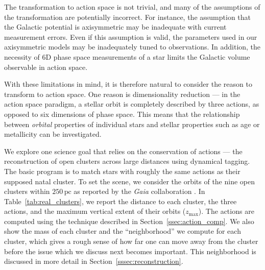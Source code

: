 \documentclass[twocolumn]{aastex62}
\newcommand{\pc}{\text{pc}}
\begin{document}
The transformation to action space is not trivial, and many of the assumptions
of the transformation are potentially incorrect. For instance, the assumption
that the Galactic potential is axisymmetric may be inadequate with current
measurement errors. Even if this assumption is valid, the parameters used in
our axisymmetric models may be inadequately tuned to observations. In
addition, the necessity of 6D phase space measurements of a star limits the
Galactic volume observable in action space.

With these limitations in mind, it is therefore natural to consider the reason
to transform to action space. One reason is dimensionality reduction --- in
the action space paradigm, a stellar orbit is completely described by three
actions, as opposed to six dimensions of phase space. This means that the
relationship between {\em orbital} properties of individual stars and stellar
properties such as age or metallicity can be investigated.

We explore one science goal that relies on the conservation of actions --- the
reconstruction of open clusters across large distances using dynamical
tagging. The basic program is to match stars with roughly the same actions as
their supposed natal cluster. To set the scene, we consider the orbits of the
nine open clusters within $250\,\pc$ as reported by the {\em Gaia}
collaboration \citep{2018AA...616A..10G}. In Table~\ref{tab:real_clusters}, we
report the distance to each cluster, the three actions, and the maximum
vertical extent of their orbits ($z_{\text{max}}$). The actions are computed
using the technique described in Section~\ref{ssec:action_comp}. We also show
the mass of each cluster and the ``neighborhood'' we compute for each cluster,
which gives a rough sense of how far one can move away from the cluster before
the issue which we discuss next becomes important. This neighborhood is
discussed in more detail in Section~\ref{sssec:reconstruction}.
\end{document}
